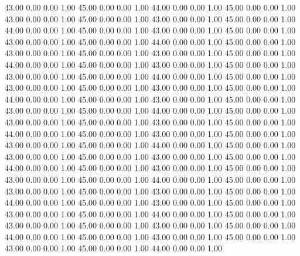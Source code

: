    43.00   0.00   0.00   1.00
   45.00   0.00   0.00   1.00
   44.00   0.00   0.00   1.00
   45.00   0.00   0.00   1.00
   43.00   0.00   0.00   1.00
   45.00   0.00   0.00   1.00
   43.00   0.00   0.00   1.00
   45.00   0.00   0.00   1.00
   44.00   0.00   0.00   1.00
   45.00   0.00   0.00   1.00
   43.00   0.00   0.00   1.00
   45.00   0.00   0.00   1.00
   43.00   0.00   0.00   1.00
   45.00   0.00   0.00   1.00
   44.00   0.00   0.00   1.00
   45.00   0.00   0.00   1.00
   43.00   0.00   0.00   1.00
   45.00   0.00   0.00   1.00
   43.00   0.00   0.00   1.00
   45.00   0.00   0.00   1.00
   44.00   0.00   0.00   1.00
   45.00   0.00   0.00   1.00
   43.00   0.00   0.00   1.00
   45.00   0.00   0.00   1.00
   43.00   0.00   0.00   1.00
   45.00   0.00   0.00   1.00
   44.00   0.00   0.00   1.00
   45.00   0.00   0.00   1.00
   43.00   0.00   0.00   1.00
   45.00   0.00   0.00   1.00
   43.00   0.00   0.00   1.00
   45.00   0.00   0.00   1.00
   44.00   0.00   0.00   1.00
   45.00   0.00   0.00   1.00
   43.00   0.00   0.00   1.00
   45.00   0.00   0.00   1.00
   43.00   0.00   0.00   1.00
   45.00   0.00   0.00   1.00
   44.00   0.00   0.00   1.00
   45.00   0.00   0.00   1.00
   43.00   0.00   0.00   1.00
   45.00   0.00   0.00   1.00
   43.00   0.00   0.00   1.00
   45.00   0.00   0.00   1.00
   44.00   0.00   0.00   1.00
   45.00   0.00   0.00   1.00
   43.00   0.00   0.00   1.00
   45.00   0.00   0.00   1.00
   43.00   0.00   0.00   1.00
   45.00   0.00   0.00   1.00
   44.00   0.00   0.00   1.00
   45.00   0.00   0.00   1.00
   43.00   0.00   0.00   1.00
   45.00   0.00   0.00   1.00
   43.00   0.00   0.00   1.00
   45.00   0.00   0.00   1.00
   44.00   0.00   0.00   1.00
   45.00   0.00   0.00   1.00
   43.00   0.00   0.00   1.00
   45.00   0.00   0.00   1.00
   43.00   0.00   0.00   1.00
   45.00   0.00   0.00   1.00
   44.00   0.00   0.00   1.00
   45.00   0.00   0.00   1.00
   43.00   0.00   0.00   1.00
   45.00   0.00   0.00   1.00
   43.00   0.00   0.00   1.00
   45.00   0.00   0.00   1.00
   44.00   0.00   0.00   1.00
   45.00   0.00   0.00   1.00
   43.00   0.00   0.00   1.00
   45.00   0.00   0.00   1.00
   43.00   0.00   0.00   1.00
   45.00   0.00   0.00   1.00
   44.00   0.00   0.00   1.00
   45.00   0.00   0.00   1.00
   43.00   0.00   0.00   1.00
   45.00   0.00   0.00   1.00
   43.00   0.00   0.00   1.00
   45.00   0.00   0.00   1.00
   44.00   0.00   0.00   1.00
   45.00   0.00   0.00   1.00
   43.00   0.00   0.00   1.00
   45.00   0.00   0.00   1.00
   43.00   0.00   0.00   1.00
   45.00   0.00   0.00   1.00
   44.00   0.00   0.00   1.00
